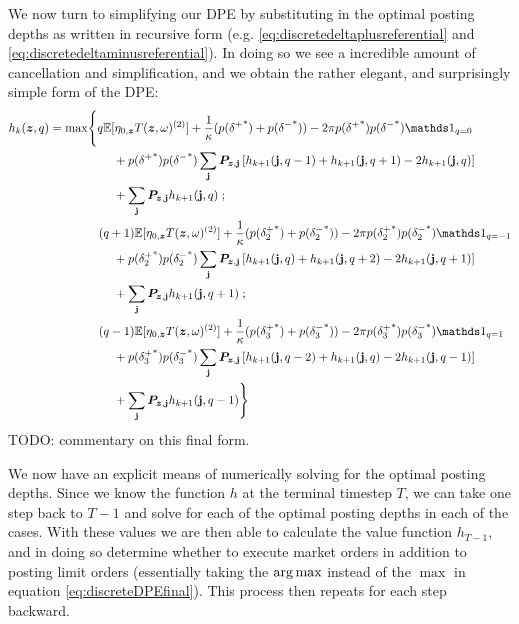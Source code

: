 We now turn to simplifying our DPE by substituting in the optimal posting depths as written in recursive form (e.g. \ref{eq:discretedeltaplusreferential} and \ref{eq:discretedeltaminusreferential}). In doing so we see a incredible amount of cancellation and simplification, and we obtain the rather elegant, and surprisingly simple form of the DPE:
\begin{equation}
\label{eq:discreteDPEfinal}
\begin{split}
h_k(\bz,q) & = \max \Biggl\lbrace 
q\E[\eta_{0,\bz} T(\bz, \omega)^{(2)}] + \frac{1}{\kappa}(p({\delta^+}^*)+p({\delta^-}^*)) -2\pi p({\delta^+}^*)p({\delta^-}^*) \indicator_{q=0} \\ 
& \hphantom{{}={} \max \biggl\lbrace {}+{}} + p({\delta^+}^*)p({\delta^-}^*)\sum_\bj \bP_{\bz,\bj} \left[ h_{k+1}(\bj, q-1) + h_{k+1}(\bj, q+1) -2 h_{k+1}(\bj, q)  \right] \\
& \hphantom{{}={} \max \biggl\lbrace {}+{}} + \sum_{\bj} \bP_{\bz,\bj} h_{k+1}(\bj,q)  \; ;\\
& \hphantom{{}={} \max \biggl\lbrace} (q+1)\E[\eta_{0,\bz} T(\bz, \omega)^{(2)}] + \frac{1}{\kappa}(p({\delta_{2}^+}^*)+p({\delta_{2}^-}^*)) -2\pi p({\delta_{2}^+}^*)p({\delta_{2}^-}^*) \indicator_{q=-1} \\ 
& \hphantom{{}={} \max \biggl\lbrace {}+{}} + p({\delta_{2}^+}^*)p({\delta_{2}^-}^*)\sum_\bj \bP_{\bz,\bj} \left[ h_{k+1}(\bj, q) + h_{k+1}(\bj, q+2) -2 h_{k+1}(\bj, q+1)  \right] \\
& \hphantom{{}={} \max \biggl\lbrace {}+{}} + \sum_{\bj} \bP_{\bz,\bj} h_{k+1}(\bj,q+1) \; ;\\
& \hphantom{{}={} \max \biggl\lbrace} (q-1)\E[\eta_{0,\bz} T(\bz, \omega)^{(2)}] + \frac{1}{\kappa}(p({\delta_3^+}^*)+p({\delta_3^-}^*)) -2\pi p({\delta_3^+}^*)p({\delta_3^-}^*) \indicator_{q=1} \\ 
& \hphantom{{}={} \max \biggl\lbrace {}+{}} + p({\delta_3^+}^*)p({\delta_3^-}^*)\sum_\bj \bP_{\bz,\bj} \left[ h_{k+1}(\bj, q-2) + h_{k+1}(\bj, q) -2 h_{k+1}(\bj, q-1)  \right] \\
& \hphantom{{}={} \max \biggl\lbrace {}+{}} + \sum_{\bj} \bP_{\bz,\bj} h_{k+1}(\bj,q-1)  \Biggr\rbrace
\end{split}
\end{equation}
TODO: commentary on this final form.

We now have an explicit means of numerically solving for the optimal posting depths. Since we know the function $h$ at the terminal timestep $T$, we can take one step back to $T-1$ and solve for each of the optimal posting depths in each of the cases. With these values we are then able to calculate the value function $h_{T-1}$, and in doing so determine whether to execute market orders in addition to posting limit orders (essentially taking the $\operatorname*{arg\,max}$ instead of the $\max$ in equation \ref{eq:discreteDPEfinal}). This process then repeats for each step backward.
